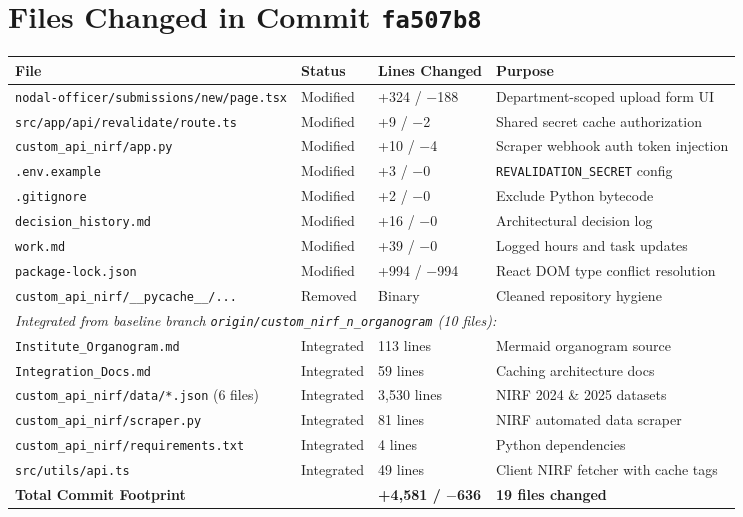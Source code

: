 \documentclass[11pt,a4paper]{article}
\begin{document}
\section*{Files Changed in Commit \texttt{fa507b8}}

\begin{table}[h]
\centering
\small
\renewcommand{\arraystretch}{1.15}
\begin{tabular}{p{6.8cm} p{1.6cm} p{2.2cm} p{4.2cm}}
\toprule
\textbf{File} & \textbf{Status} & \textbf{Lines Changed} & \textbf{Purpose} \\
\midrule
\texttt{nodal-officer/submissions/new/page.tsx} & Modified & +324 / $-$188 & Department-scoped upload form UI \\
\texttt{src/app/api/revalidate/route.ts} & Modified & +9 / $-$2 & Shared secret cache authorization \\
\texttt{custom\_api\_nirf/app.py} & Modified & +10 / $-$4 & Scraper webhook auth token injection \\
\texttt{.env.example} & Modified & +3 / $-$0 & \texttt{REVALIDATION\_SECRET} config \\
\texttt{.gitignore} & Modified & +2 / $-$0 & Exclude Python bytecode \\
\texttt{decision\_history.md} & Modified & +16 / $-$0 & Architectural decision log \\
\texttt{work.md} & Modified & +39 / $-$0 & Logged hours and task updates \\
\texttt{package-lock.json} & Modified & +994 / $-$994 & React DOM type conflict resolution \\
\texttt{custom\_api\_nirf/\_\_pycache\_\_/...} & Removed & Binary & Cleaned repository hygiene \\
\midrule
\multicolumn{4}{l}{\textit{Integrated from baseline branch \texttt{origin/custom\_nirf\_n\_organogram} (10 files):}} \\
\texttt{Institute\_Organogram.md} & Integrated & 113 lines & Mermaid organogram source \\
\texttt{Integration\_Docs.md} & Integrated & 59 lines & Caching architecture docs \\
\texttt{custom\_api\_nirf/data/*.json} (6 files) & Integrated & 3,530 lines & NIRF 2024 \& 2025 datasets \\
\texttt{custom\_api\_nirf/scraper.py} & Integrated & 81 lines & NIRF automated data scraper \\
\texttt{custom\_api\_nirf/requirements.txt} & Integrated & 4 lines & Python dependencies \\
\texttt{src/utils/api.ts} & Integrated & 49 lines & Client NIRF fetcher with cache tags \\
\midrule
\textbf{Total Commit Footprint} & & \textbf{+4,581 / $-$636} & \textbf{19 files changed} \\
\bottomrule
\end{tabular}
\end{table}
\end{document}
